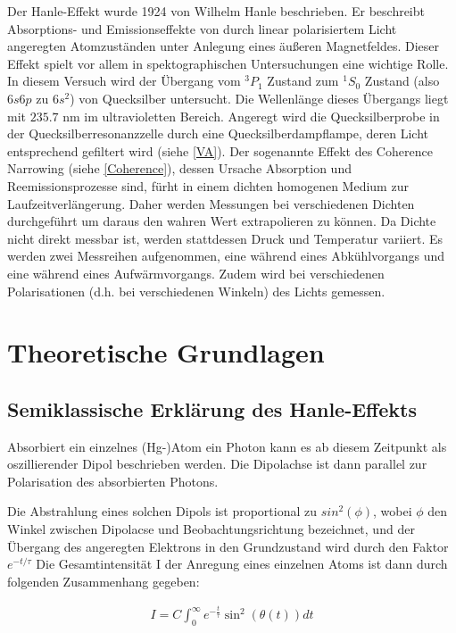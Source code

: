 \documentclass[12pt]{article}
\begin{document}
Der Hanle-Effekt wurde 1924 von Wilhelm Hanle beschrieben. Er beschreibt  Absorptions- und Emissionseffekte von durch linear polarisiertem Licht angeregten Atomzuständen  unter Anlegung eines äußeren Magnetfeldes. Dieser Effekt spielt vor allem in spektographischen Untersuchungen eine wichtige Rolle. In diesem Versuch wird der Übergang vom  $^3P_1$ Zustand  zum  $^1S_0$ Zustand (also $6s6p$ zu $6s^2$) von Quecksilber untersucht. Die Wellenlänge dieses Übergangs liegt mit $235.7$ nm  im ultravioletten Bereich. Angeregt wird die Quecksilberprobe in der Quecksilberresonanzzelle durch eine Quecksilberdampflampe, deren Licht entsprechend gefiltert wird (siehe \ref{VA}). Der sogenannte Effekt des Coherence Narrowing (siehe \ref{Coherence}), dessen Ursache Absorption und Reemissionsprozesse sind, fürht in einem dichten homogenen Medium zur Laufzeitverlängerung. Daher werden Messungen bei verschiedenen Dichten durchgeführt um daraus den wahren Wert extrapolieren zu können. Da Dichte nicht direkt messbar ist, werden stattdessen Druck und Temperatur variiert. Es werden zwei Messreihen aufgenommen, eine während eines Abkühlvorgangs und eine während eines Aufwärmvorgangs. Zudem wird bei verschiedenen Polarisationen (d.h. bei verschiedenen Winkeln) des Lichts gemessen.



\newpage
\section{Theoretische Grundlagen}

\subsection{Semiklassische Erklärung des Hanle-Effekts}

Absorbiert ein einzelnes (Hg-)Atom ein Photon kann es ab diesem Zeitpunkt als oszillierender Dipol beschrieben werden. Die Dipolachse ist dann parallel zur Polarisation des absorbierten Photons. 


Die Abstrahlung eines solchen Dipols ist proportional zu $sin^2(\phi) $, wobei $\phi$ den Winkel zwischen Dipolacse und Beobachtungsrichtung bezeichnet, und der Übergang des angeregten Elektrons in den Grundzustand wird durch den Faktor $e^{-t/\tau}$
Die Gesamtintensität I der Anregung eines einzelnen Atoms ist dann durch folgenden Zusammenhang gegeben:

\begin{align}
I=C\int_{0}^{\infty}e^{-\frac{t}{\tau}}\sin^2(\theta(t)) dt
\end{align}
\end{document}
